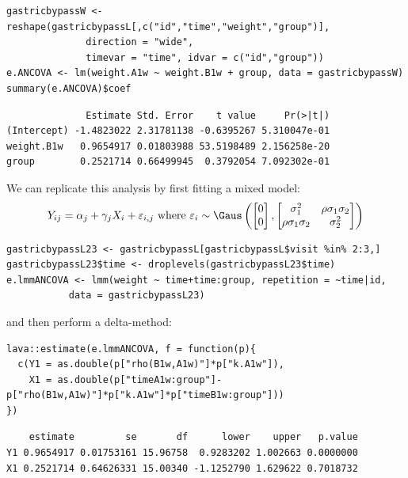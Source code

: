 \documentclass[12pt]{article}
\begin{document}
\lstset{language=r,label= ,caption= ,captionpos=b,numbers=none}
\begin{lstlisting}
gastricbypassW <- reshape(gastricbypassL[,c("id","time","weight","group")],
			  direction = "wide",
			  timevar = "time", idvar = c("id","group"))
e.ANCOVA <- lm(weight.A1w ~ weight.B1w + group, data = gastricbypassW)
summary(e.ANCOVA)$coef
\end{lstlisting}

\begin{verbatim}
              Estimate Std. Error    t value     Pr(>|t|)
(Intercept) -1.4823022 2.31781138 -0.6395267 5.310047e-01
weight.B1w   0.9654917 0.01803988 53.5198489 2.156258e-20
group        0.2521714 0.66499945  0.3792054 7.092302e-01
\end{verbatim}


We can replicate this analysis by first fitting a mixed model:
\[ Y_{ij} = \alpha_j + \gamma_j X_{i} + \varepsilon_{i,j} \text{ where } \varepsilon_i \sim \Gaus \left( \begin{bmatrix} 0 \\ 0 \end{bmatrix}, \begin{bmatrix} \sigma^2_1 & \rho \sigma_1 \sigma_2 \\ \rho \sigma_1 \sigma_2 & \sigma^2_2 \end{bmatrix} \right) \]
\lstset{language=r,label= ,caption= ,captionpos=b,numbers=none}
\begin{lstlisting}
gastricbypassL23 <- gastricbypassL[gastricbypassL$visit %in% 2:3,]
gastricbypassL23$time <- droplevels(gastricbypassL23$time)
e.lmmANCOVA <- lmm(weight ~ time+time:group, repetition = ~time|id,
		   data = gastricbypassL23)
\end{lstlisting}

and then perform a delta-method:
\lstset{language=r,label= ,caption= ,captionpos=b,numbers=none}
\begin{lstlisting}
lava::estimate(e.lmmANCOVA, f = function(p){
  c(Y1 = as.double(p["rho(B1w,A1w)"]*p["k.A1w"]),
    X1 = as.double(p["timeA1w:group"]-p["rho(B1w,A1w)"]*p["k.A1w"]*p["timeB1w:group"]))
})
\end{lstlisting}

\begin{verbatim}
    estimate         se       df      lower    upper   p.value
Y1 0.9654917 0.01753161 15.96758  0.9283202 1.002663 0.0000000
X1 0.2521714 0.64626331 15.00340 -1.1252790 1.629622 0.7018732
\end{verbatim}
\end{document}
